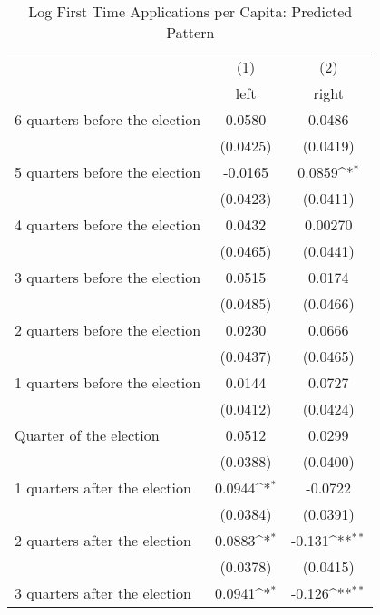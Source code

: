 \begin{table}[htbp]\centering
\def\sym#1{\ifmmode^{#1}\else\(^{#1}\)\fi}
\caption{Log First Time Applications per Capita: Predicted Pattern}
\begin{tabular}{l*{2}{c}}
\hline\hline
                    &\multicolumn{1}{c}{(1)}&\multicolumn{1}{c}{(2)}\\
                    &\multicolumn{1}{c}{left}&\multicolumn{1}{c}{right}\\
\hline
 6 quarters before the election&      0.0580         &      0.0486         \\
                    &    (0.0425)         &    (0.0419)         \\
[1em]
 5 quarters before the election&     -0.0165         &      0.0859\sym{*}  \\
                    &    (0.0423)         &    (0.0411)         \\
[1em]
 4 quarters before the election&      0.0432         &     0.00270         \\
                    &    (0.0465)         &    (0.0441)         \\
[1em]
 3 quarters before the election&      0.0515         &      0.0174         \\
                    &    (0.0485)         &    (0.0466)         \\
[1em]
 2 quarters before the election&      0.0230         &      0.0666         \\
                    &    (0.0437)         &    (0.0465)         \\
[1em]
 1 quarters before the election&      0.0144         &      0.0727         \\
                    &    (0.0412)         &    (0.0424)         \\
[1em]
Quarter of the election&      0.0512         &      0.0299         \\
                    &    (0.0388)         &    (0.0400)         \\
[1em]
 1 quarters after the election&      0.0944\sym{*}  &     -0.0722         \\
                    &    (0.0384)         &    (0.0391)         \\
[1em]
 2 quarters after the election&      0.0883\sym{*}  &      -0.131\sym{**} \\
                    &    (0.0378)         &    (0.0415)         \\
[1em]
 3 quarters after the election&      0.0941\sym{*}  &      -0.126\sym{**} \\

\end{tabular}
\end{table}
